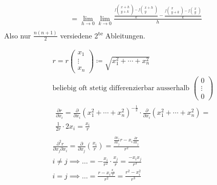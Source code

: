 \begin{satz*}
\begin{bew}[head = Beweisidee]
\begin{gather*}
\begin{split}
					&= \lim_{h \rightarrow 0} \lim_{k \rightarrow 0} \frac{\frac{f\begin{pmatrix} x+h \\ y+k \end{pmatrix} - f\begin{pmatrix} x+h \\ y \end{pmatrix}}{k} - \frac{f\begin{pmatrix} x \\ y+k \end{pmatrix} - f\begin{pmatrix} x \\ y \end{pmatrix}}{k}}{h}
				\end{split}
		\end{gather*}
		Also nur $\frac{n(n+1)}{2}$ versiedene 2\textsuperscript{te} Ableitungen.
	\end{bew}
\end{satz*}
\begin{bsp*}
	\begin{gather*}
		r = r\begin{pmatrix} x_1 \\ \vdots \\ x_n \end{pmatrix} \coloneqq \sqrt{x_1^2 + \dotsb + x_n^2} \\
		\text{beliebig oft stetig differenzierbar ausserhalb } \begin{pmatrix} 0 \\ \vdots \\ 0 \end{pmatrix} \\
		\begin{multlined}
			\frac{\partial r}{\partial x_i} = \frac{\partial}{\partial x_i} (x_1^2 + \dotsb + x_n^2)^{-\frac{1}{2}} \cdot \frac{\partial}{\partial x_i} (x_1^2 + \dotsb + x_n^2) = \\
			\frac{1}{2r} \cdot 2 x_i = \frac{x_i}{r}
		\end{multlined} \\
		\frac{\partial^2 r}{\partial x_j \partial x_i} = \frac{\partial}{\partial x_j} \left( \frac{x_i}{r} \right) = \frac{\frac{\partial x_i}{\partial x_j} r - x_i \frac{\partial r}{\partial x_j}}{r^2} \\
		i \neq j \implies \dots = -\frac{x_i}{r^2} \cdot \frac{x_j}{r} = \frac{-x_i x_j}{r^3} \\
		i = j \implies \dots = \frac{r - x_i \frac{x_i}{r}}{r^2} = \frac{r^2 - x_i^2}{r^3}
	\end{gather*}
\end{bsp*}

